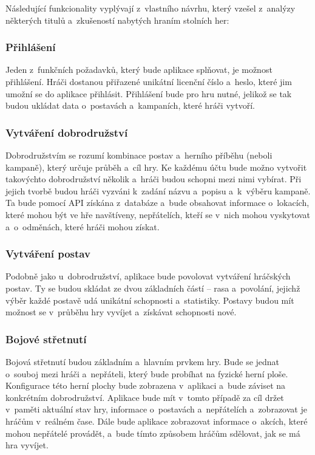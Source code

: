 Následující funkcionality vyplývají z~vlastního návrhu, který vzešel z~analýzy některých titulů a~zkušeností nabytých hraním stolních her:

\subsubsection*{Přihlášení}
Jeden z~funkčních požadavků, který bude aplikace splňovat, je možnost přihlášení. Hráči dostanou přiřazené unikátní licenční číslo a~heslo, které jim umožní se do aplikace přihlásit. Přihlášení bude pro hru nutné, jelikož se tak budou ukládat data o~postavách a~kampaních, které hráči vytvoří.

\subsubsection*{Vytváření dobrodružství}\label{sec:adventure}
Dobrodružstvím se rozumí kombinace postav a~herního příběhu (neboli kampaně), který určuje průběh a~cíl hry. Ke každému účtu bude možno vytvořit takovýchto dobrodružství několik a~hráči budou schopni mezi nimi vybírat. Při jejich tvorbě budou hráči vyzváni k~zadání názvu a~popisu a~k~výběru kampaně. Ta bude pomocí API získána z~databáze a~bude obsahovat informace o~lokacích, které mohou být ve hře navštíveny, nepřátelích, kteří se v~nich mohou vyskytovat a~o~odměnách, které hráči mohou získat.

\subsubsection*{Vytváření postav}
Podobně jako u~dobrodružství, aplikace bude povolovat vytváření hráčských postav. Ty se budou skládat ze dvou základních částí -- rasa a~povolání, jejichž výběr každé postavě udá unikátní schopnosti a~statistiky. Postavy budou mít možnost se v~průběhu hry vyvíjet a~získávat schopnosti nové.

\subsubsection*{Bojové střetnutí}
Bojová střetnutí budou základním a~hlavním prvkem hry. Bude se jednat o~souboj mezi hráči a~nepřáteli, který bude probíhat na fyzické herní ploše. Konfigurace této herní plochy bude zobrazena v~aplikaci a~bude záviset na konkrétním dobrodružství. Aplikace bude mít v~tomto případě za cíl držet v~paměti aktuální stav hry, informace o~postavách a~nepřátelích a~zobrazovat je hráčům v~reálném čase. Dále bude aplikace zobrazovat informace o~akcích, které mohou nepřátelé provádět, a~bude tímto způsobem hráčům sdělovat, jak se má hra vyvíjet.

